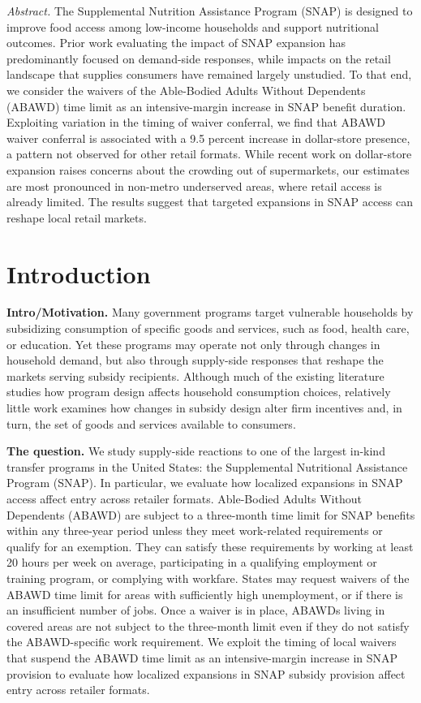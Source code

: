 \documentclass[12pt]{article}
\begin{document}
\textit{Abstract.} The Supplemental Nutrition Assistance Program (SNAP) is designed to improve food access among low-income households and support nutritional outcomes. Prior work evaluating the impact of SNAP expansion has predominantly focused on demand-side responses, while impacts on the retail landscape that supplies consumers have remained largely unstudied. To that end, we consider the waivers of the Able-Bodied Adults Without Dependents (ABAWD) time limit as an intensive-margin increase in SNAP benefit duration. Exploiting variation in the timing of waiver conferral, we find that ABAWD waiver conferral is associated with a 9.5 percent increase in dollar-store presence, a pattern not observed for other retail formats. While recent work on dollar-store expansion raises concerns about the crowding out of supermarkets, our estimates are most pronounced in non-metro underserved areas, where retail access is already limited. The results suggest that targeted expansions in SNAP access can reshape local retail markets.

\newpage
\section{Introduction}

\textbf{Intro/Motivation.} Many government programs target vulnerable households by subsidizing consumption of specific goods and services, such as food, health care, or education. Yet these programs may operate not only through changes in household demand, but also through supply-side responses that reshape the markets serving subsidy recipients. Although much of the existing literature studies how program design affects household consumption choices, relatively little work examines how changes in subsidy design alter firm incentives and, in turn, the set of goods and services available to consumers.

\textbf{The question.} We study supply-side reactions to one of the largest in-kind transfer programs in the United States: the Supplemental Nutritional Assistance Program (SNAP). In particular, we evaluate how localized expansions in SNAP access affect entry across retailer formats. Able-Bodied Adults Without Dependents (ABAWD) are subject to a three-month time limit for SNAP benefits within any three-year period unless they meet work-related requirements or qualify for an exemption. They can satisfy these requirements by working at least 20 hours per week on average, participating in a qualifying employment or training program, or complying with workfare. States may request waivers of the ABAWD time limit for areas with sufficiently high unemployment, or if there is an insufficient number of jobs. Once a waiver is in place, ABAWDs living in covered areas are not subject to the three-month limit even if they do not satisfy the ABAWD-specific work requirement. We exploit the timing of local waivers that suspend the  ABAWD  time limit as an intensive-margin increase in SNAP provision to evaluate how localized expansions in SNAP subsidy provision affect entry across retailer formats.
\end{document}
